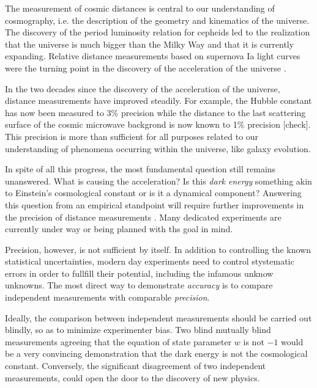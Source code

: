 The measurement of cosmic distances is central to our understanding of
cosmography, i.e. the description of the geometry and kinematics of
the universe. The discovery of the period luminosity relation for
cepheids led to the realization that the universe is much bigger than
the Milky Way and that it is currently expanding. Relative distance
measurements based on supernova Ia light curves were the turning point
in the discovery of the acceleration of the universe
\citep{Riess:1998p21184,Per++99}.

In the two decades since the discovery of the acceleration of the
universe, distance measurements have improved steadily. For example,
the Hubble constant has now been measured to 3\% precision
\citep{Rie++11,Fre++12}
while the distance to the last scattering surface of the cosmic
microwave backgrond is now known to 1\% precision [check]. This
precision is more than sufficient for all purposes related to our
understanding of phenomena occurring within the universe, like galaxy
evolution.

In spite of all this progress, the most fundamental question still
remains unanswered. What is causing the acceleration? Is this {\it
dark energy} something akin to Einstein's cosmological constant or is
it a dynamical component? Answering this question from an empirical
standpoint will require further improvements in the precision of
distance measurements \citep{Wei++13}.  Many dedicated experiments are
currently under way or being planned with ths goal in mind.

Precision, however, is not sufficient by itself. In addition to
controlling the known statistical uncertainties, modern day
experiments need to control stystematic errors in order to fullfill
their potential, including the infamous unknow unknowns. The most
direct way to demonstrate {\it accuracy} is to compare independent
measurements with comparable {\it precision}.

Ideally, the comparison between independent measurements should be
carried out blindly, so as to minimize experimenter bias. Two blind
mutually blind measurements agreeing that the equation of state
parameter $w$ is not $-1$ would be a very convincing demonstration
that the dark energy is not the cosmological constant. Conversely, the
significant disagreement of two independent measurements, could open
the door to the discovery of new physics.


